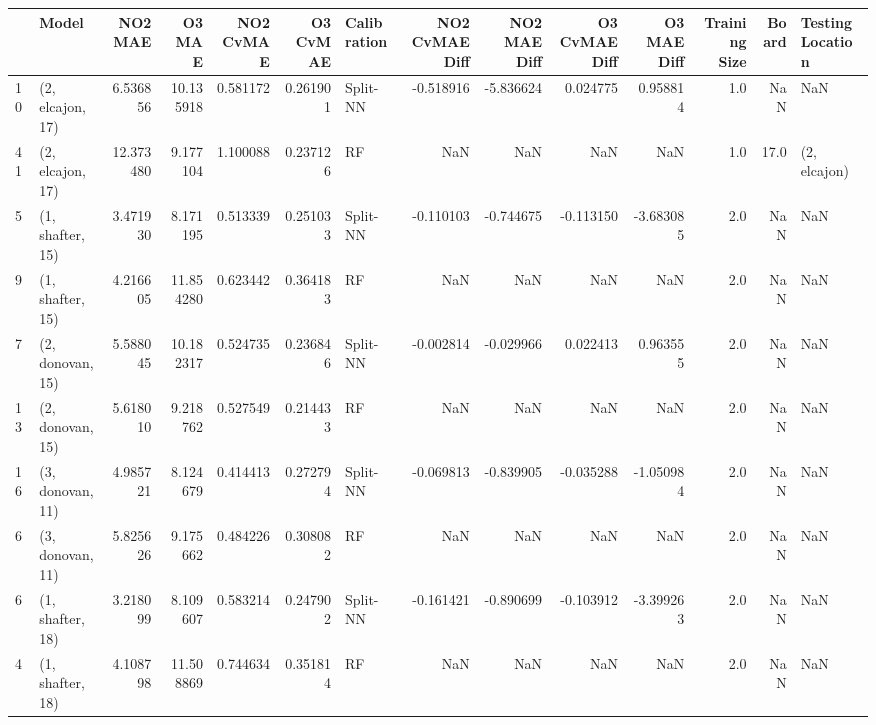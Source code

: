 \begin{tabular}{llrrrrlrrrrrrl}
\toprule
{} &             Model &    NO2 MAE &     O3 MAE &  NO2 CvMAE &  O3 CvMAE & Calibration &  NO2 CvMAE Diff &  NO2 MAE Diff &  O3 CvMAE Diff &  O3 MAE Diff &  Training Size &  Board & Testing Location \\
\midrule
10 &  (2, elcajon, 17) &   6.536856 &  10.135918 &   0.581172 &  0.261901 &    Split-NN &       -0.518916 &     -5.836624 &       0.024775 &     0.958814 &            1.0 &    NaN &              NaN \\
41 &  (2, elcajon, 17) &  12.373480 &   9.177104 &   1.100088 &  0.237126 &          RF &             NaN &           NaN &            NaN &          NaN &            1.0 &   17.0 &     (2, elcajon) \\
5  &  (1, shafter, 15) &   3.471930 &   8.171195 &   0.513339 &  0.251033 &    Split-NN &       -0.110103 &     -0.744675 &      -0.113150 &    -3.683085 &            2.0 &    NaN &              NaN \\
9  &  (1, shafter, 15) &   4.216605 &  11.854280 &   0.623442 &  0.364183 &          RF &             NaN &           NaN &            NaN &          NaN &            2.0 &    NaN &              NaN \\
7  &  (2, donovan, 15) &   5.588045 &  10.182317 &   0.524735 &  0.236846 &    Split-NN &       -0.002814 &     -0.029966 &       0.022413 &     0.963555 &            2.0 &    NaN &              NaN \\
13 &  (2, donovan, 15) &   5.618010 &   9.218762 &   0.527549 &  0.214433 &          RF &             NaN &           NaN &            NaN &          NaN &            2.0 &    NaN &              NaN \\
16 &  (3, donovan, 11) &   4.985721 &   8.124679 &   0.414413 &  0.272794 &    Split-NN &       -0.069813 &     -0.839905 &      -0.035288 &    -1.050984 &            2.0 &    NaN &              NaN \\
6  &  (3, donovan, 11) &   5.825626 &   9.175662 &   0.484226 &  0.308082 &          RF &             NaN &           NaN &            NaN &          NaN &            2.0 &    NaN &              NaN \\
6  &  (1, shafter, 18) &   3.218099 &   8.109607 &   0.583214 &  0.247902 &    Split-NN &       -0.161421 &     -0.890699 &      -0.103912 &    -3.399263 &            2.0 &    NaN &              NaN \\
4  &  (1, shafter, 18) &   4.108798 &  11.508869 &   0.744634 &  0.351814 &          RF &             NaN &           NaN &            NaN &          NaN &            2.0 &    NaN &              NaN \\

\end{tabular}
